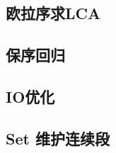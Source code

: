 \documentclass[a4paper,12pt]{article}
\begin{document}
\subsection{欧拉序求LCA}

\subsection{保序回归}

\subsection{IO优化}

\subsection{Set 维护连续段}


\label{LastPage}
\end{document}
